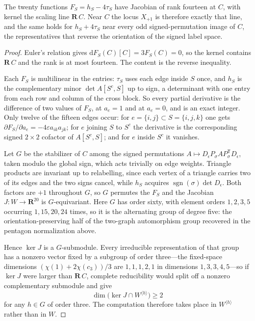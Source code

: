 \begin{theorem}
\label{thm:golden-equality-rigidity}
The twenty functions \(F_S=h_S-4\tau_S\) have Jacobian of rank fourteen at
\(C\), with kernel the scaling line \(\mathbf R\,C\).  Near \(C\) the locus
\(X_{+1}\) is therefore exactly that line, and the same holds for
\(h_S+4\tau_S\) near every odd signed-permutation image of \(C\), the
representatives that reverse the orientation of the signed label space.
\end{theorem}

\begin{proof}
Euler's relation gives \(\mathrm dF_S(C)[C]=3F_S(C)=0\), so the kernel contains
\(\mathbf R\,C\) and the rank is at most fourteen.  The content is the reverse
inequality.

Each \(F_S\) is multilinear in the entries: \(\tau_S\) uses each edge inside
\(S\) once, and \(h_S\) is the complementary minor \(\det A[S^c,S]\) up to sign,
a determinant with one entry from each row and column of the cross block.  So
every partial derivative is the difference of two values of \(F_S\), at
\(a_e=1\) and at \(a_e=0\), and is an exact integer.  Only twelve of the fifteen
edges occur: for \(e=\{i,j\}\subset S=\{i,j,k\}\) one gets
\(\partial F_S/\partial a_e=-4\varepsilon a_{ik}a_{jk}\); for \(e\) joining
\(S\) to \(S^c\) the derivative is the corresponding signed \(2\times2\) cofactor
of \(A[S^c,S]\); and for \(e\) inside \(S^c\) it vanishes.

Let \(G\) be the stabilizer of \(C\) among the signed permutations
\(A\mapsto D_\epsilon P_\sigma AP_\sigma^{\mathsf T}D_\epsilon\), taken modulo
the global sign, which acts trivially on edge weights.  Triangle products are
invariant up to relabelling, since each vertex of a triangle carries two of its
edges and the two signs cancel, while \(h_S\) acquires
\(\operatorname{sgn}(\sigma)\det D_\epsilon\).  Both factors are \(+1\)
throughout \(G\), so \(G\) permutes the \(F_S\) and the Jacobian
\(J\colon W\to\mathbf R^{20}\) is \(G\)-equivariant.  Here \(G\) has order sixty,
with element orders \(1,2,3,5\) occurring \(1,15,20,24\) times, so it is the
alternating group of degree five: the orientation-preserving half of the
two-graph automorphism group recovered in the pentagon normalization above.

Hence \(\ker J\) is a \(G\)-submodule.  Every irreducible representation of that
group has a nonzero vector fixed by a subgroup of order three---the fixed-space
dimensions \((\chi(1)+2\chi(c_3))/3\) are \(1,1,1,2,1\) in dimensions
\(1,3,3,4,5\)---so if \(\ker J\) were larger than \(\mathbf R\,C\), complete
reducibility would split off a nonzero complementary submodule and give
\[
 \dim\bigl(\ker J\cap W^{\langle h\rangle}\bigr)\ge2
\]
for any \(h\in G\) of order three.  The computation therefore takes place in
\(W^{\langle h\rangle}\) rather than in \(W\).


\end{proof}
